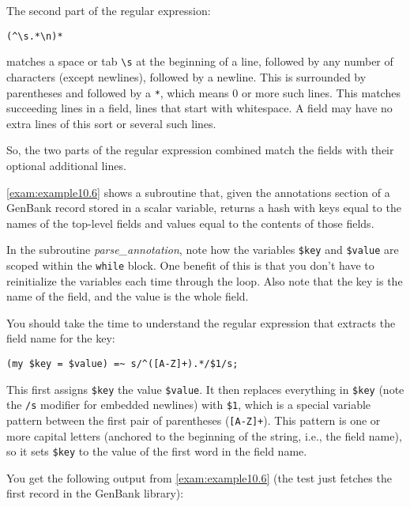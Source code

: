 The second part of the regular expression:
  
\begin{lstlisting}
(^\s.*\n)*
\end{lstlisting}

matches a space or tab \verb|\s| at the beginning of a line, followed by any number of characters (except newlines), followed by a newline. This is surrounded by parentheses and followed by a \verb|*|, which means 0 or more such lines. This matches succeeding lines in a field, lines that start with whitespace. A field may have no extra lines of this sort or several such lines.

So, the two parts of the regular expression combined match the fields with their optional additional lines.

\autoref{exam:example10.6} shows a subroutine that, given the annotations section of a GenBank record stored in a scalar variable, returns a hash with keys equal to the names of the top-level fields and values equal to the contents of those fields.



In the subroutine \textit{parse\_annotation}, note how the variables \verb|$key| and \verb|$value| are scoped within the \verb|while| block. One benefit of this is that you don't have to reinitialize the variables each time through the loop. Also note that the key is the name of the field, and the value is the whole field.

You should take the time to understand the regular expression that extracts the field name for the key:

\begin{lstlisting}
(my $key = $value) =~ s/^([A-Z]+).*/$1/s;
\end{lstlisting}

This first assigns \verb|$key| the value \verb|$value|. It then replaces everything in \verb|$key| (note the \verb|/s| modifier for embedded newlines) with \verb|$1|, which is a special variable pattern between the first pair of parentheses (\verb|[A-Z]+|).  This pattern is one or more capital letters (anchored to the beginning of the string, i.e., the field name), so it sets \verb|$key| to the value of the first word in the field name.

You get the following output from \autoref{exam:example10.6} (the test just fetches the first record in the GenBank library):

